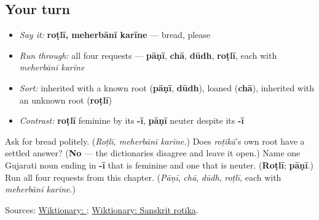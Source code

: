 \subsection*{Your turn}
\begin{itemize}
\raggedright
  \item \emph{Say it:} \textbf{roṭlī, meherbānī karīne} — bread, please
  \item \emph{Run through:} all four requests — \textbf{pāṇī}, \textbf{chā}, \textbf{dūdh}, \textbf{roṭlī}, each with \emph{meherbānī karīne}
  \item \emph{Sort:} inherited with a known root (\textbf{pāṇī}, \textbf{dūdh}), loaned (\textbf{chā}), inherited with an unknown root (\textbf{roṭlī})
  \item \emph{Contrast:} \textbf{roṭlī} feminine by its \textbf{-ī}, \textbf{pāṇī} neuter despite its \textbf{-ī}
\end{itemize}

\begin{tcolorbox}[breakable,colback=teal!4,colframe=teal!35!black,title={Before you move on}]
Ask for bread politely. (\emph{Roṭlī, meherbānī karīne.}) Does \emph{roṭikā}'s own root have a settled answer? (\textbf{No} — the dictionaries disagree and leave it open.) Name one Gujarati noun ending in \textbf{-ī} that is feminine and one that is neuter. (\textbf{Roṭlī}; \textbf{pāṇī}.) Run all four requests from this chapter. (\emph{Pāṇī}, \emph{chā}, \emph{dūdh}, \emph{roṭlī}, each with \emph{meherbānī karīne}.)

Sources: \href{https://en.wiktionary.org/wiki/\%E0\%AA\%B0\%E0\%AB\%8B\%E0\%AA\%9F\%E0\%AA\%B2\%E0\%AB\%80}{Wiktionary: }; \href{https://en.wiktionary.org/wiki/\%E0\%A4\%B0\%E0\%A5\%8B\%E0\%A4\%9F\%E0\%A4\%BF\%E0\%A4\%95\%E0\%A4\%BE}{Wiktionary: Sanskrit rotika}.
\end{tcolorbox}
